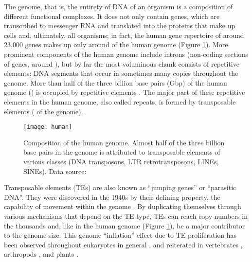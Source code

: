 The genome, that is, the entirety of DNA of an organism is a composition
of different functional complexes. It does not only contain genes, which
are transcribed to messenger RNA and translated into the proteins that
make up cells and, ultimately, all organisms; in fact, the human gene
repertoire of around 23,000 genes makes up only around  of the human
genome \citep{Makalowski2001} (Figure \ref{fig:human-genome}). More
prominent components of the human genome include introns (non-coding
sections of genes, around ), but by far the most voluminous chunk
consists of repetitive elements: DNA segments that occur in sometimes
many copies throughout the genome.  More than half of the three billion
base pairs (Gbp) of the human genome () is occupied by repetitive
elements \citep{Lander2001}. The major part of these repetitive elements
in the human genome, also called repeats, is formed by transposable
elements ( of the genome).

\begin{figure}
	\centering
  \begin{minipage}[c]{0.3\textwidth}
		\caption[Composition of the human genome]{Composition of the human
		genome. Almost half of the three billion base pairs in the genome is
		attributed to transposable elements of various classes (DNA transposons,
		LTR retrotransposons, LINEs, SINEs). Data source: \citet{Lander2001}}
		\label{fig:human-genome}
  \end{minipage}\hspace{3em}
  \begin{minipage}[c]{0.3\textwidth}
		\texttt{[image: human]}
  \end{minipage}
\end{figure}

Transposable elements (TEs) are also known as ``jumping genes'' or
``parasitic DNA''. They were discovered in the 1940s by their defining
property, the capability of movement within the genome
\citep{McClintock1950}. By duplicating themselves through various
mechanisms that depend on the TE type, TEs can reach copy numbers in the
thousands \citep{Petersen2018} and, like in the human genome (Figure
\ref{fig:human-genome}), be a major contributor to the genome size. This
genome ``inflation'' effect due to TE proliferation has been observed
throughout eukaryotes in general \citep{Chenais2012}, and reiterated in
vertebrates \citep{Chalopin2015}, arthropods \citep{Petersen2018}, and
plants \citep{Staton2015}. 

